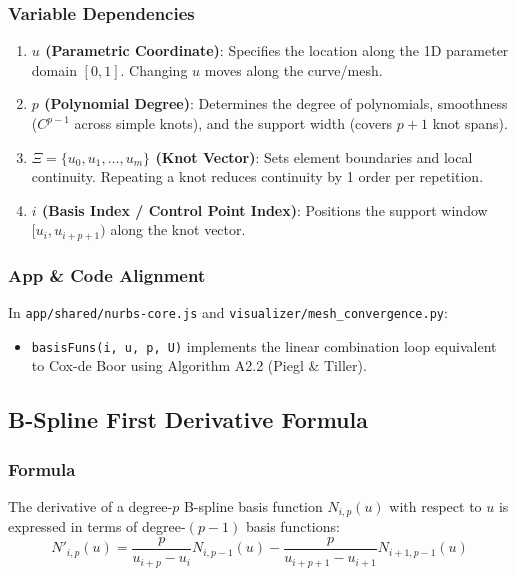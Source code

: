 \subsubsection{Variable Dependencies}
\begin{enumerate}
    \item \textbf{$u$ (Parametric Coordinate)}: Specifies the location along the 1D parameter domain $[0, 1]$. Changing $u$ moves along the curve/mesh.
    \item \textbf{$p$ (Polynomial Degree)}: Determines the degree of polynomials, smoothness ($C^{p-1}$ across simple knots), and the support width (covers $p+1$ knot spans).
    \item \textbf{$\Xi = \{u_0, u_1, \dots, u_{m}\}$ (Knot Vector)}: Sets element boundaries and local continuity. Repeating a knot reduces continuity by 1 order per repetition.
    \item \textbf{$i$ (Basis Index / Control Point Index)}: Positions the support window $[u_i, u_{i+p+1})$ along the knot vector.
\end{enumerate}

\subsubsection{App \& Code Alignment}
In \texttt{app/shared/nurbs-core.js} and \texttt{visualizer/mesh\_convergence.py}:
\begin{itemize}
    \item \texttt{basisFuns(i, u, p, U)} implements the linear combination loop equivalent to Cox-de Boor using Algorithm A2.2 (Piegl \& Tiller).
\end{itemize}

\hr

\subsection{B-Spline First Derivative Formula}

\subsubsection{Formula}
The derivative of a degree-$p$ B-spline basis function $N_{i,p}(u)$ with respect to $u$ is expressed in terms of degree-$(p-1)$ basis functions:
\begin{equation}
N'_{i,p}(u) = \frac{p}{u_{i+p} - u_i} N_{i,p-1}(u) - \frac{p}{u_{i+p+1} - u_{i+1}} N_{i+1,p-1}(u)
\end{equation}

